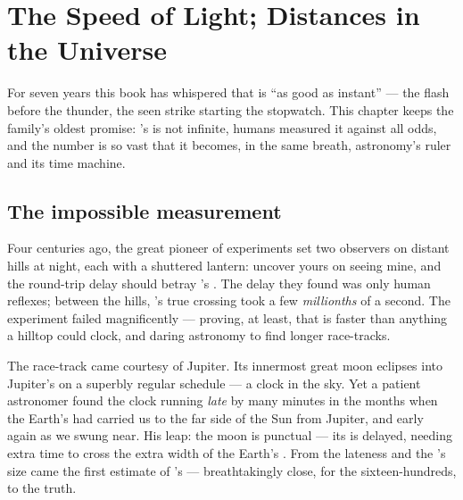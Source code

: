 \chapter{The Speed of Light; Distances in the Universe}\label{ch:g8:speed-of-light}

For seven years this book has whispered that  is ``as good
as instant'' --- the flash before the thunder, the seen strike
starting the stopwatch. This chapter keeps the family's oldest
promise: 's  is not infinite, humans measured it
against all odds, and the number is so vast that it becomes,
in the same breath, astronomy's ruler and its time machine.

\section{The impossible measurement}

\begin{example}\label{ex:g8:speed-of-light:galileo}
Four centuries ago, the great pioneer of experiments set two
observers on distant hills at night, each with a shuttered
lantern: uncover yours on seeing mine, and the round-trip
delay should betray 's . The delay they found was
only human reflexes; between the hills, 's true crossing
took a few \emph{millionths} of a second. The experiment
failed magnificently --- proving, at least, that  is
faster than anything a hilltop could clock, and daring
astronomy to find longer race-tracks.
\end{example}

\begin{example}\label{ex:g8:speed-of-light:romer}
The race-track came courtesy of Jupiter. Its innermost great
moon eclipses into Jupiter's  on a superbly regular
schedule --- a clock in the sky. Yet a patient astronomer
found the clock running \emph{late} by many minutes in the
months when the Earth's  had carried us to the far side
of the Sun from Jupiter, and early again as we swung near.
His leap: the moon is punctual --- its \emph{} is
delayed, needing extra time to cross the extra width of the
Earth's . From the lateness and the 's size came
the first estimate of 's  --- breathtakingly close,
for the sixteen-hundreds, to the truth.
\end{example}

